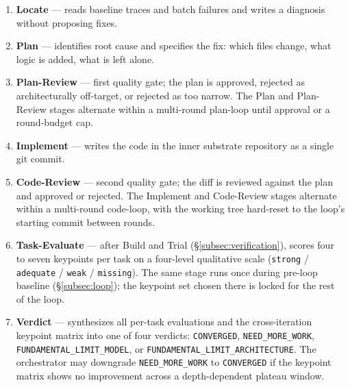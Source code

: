 \documentclass{article}
\begin{document}
\begin{enumerate}
  \item \textbf{Locate} --- reads baseline traces and batch failures and writes a diagnosis without proposing fixes.
  \item \textbf{Plan} --- identifies root cause and specifies the fix: which files change, what logic is added, what is left alone.
  \item \textbf{Plan-Review} --- first quality gate; the plan is approved, rejected as architecturally off-target, or rejected as too narrow. The Plan and Plan-Review stages alternate within a multi-round plan-loop until approval or a round-budget cap.
  \item \textbf{Implement} --- writes the code in the inner substrate repository as a single git commit.
  \item \textbf{Code-Review} --- second quality gate; the diff is reviewed against the plan and approved or rejected. The Implement and Code-Review stages alternate within a multi-round code-loop, with the working tree hard-reset to the loop's starting commit between rounds.
  \item \textbf{Task-Evaluate} --- after Build and Trial (\S\ref{subsec:verification}), scores four to seven keypoints per task on a four-level qualitative scale (\texttt{strong} / \texttt{adequate} / \texttt{weak} / \texttt{missing}). The same stage runs once during pre-loop baseline (\S\ref{subsec:loop}); the keypoint set chosen there is locked for the rest of the loop.
  \item \textbf{Verdict} --- synthesizes all per-task evaluations and the cross-iteration keypoint matrix into one of four verdicts: \texttt{CONVERGED}, \texttt{NEED\_MORE\_WORK}, \texttt{FUNDAMENTAL\_LIMIT\_MODEL}, or \texttt{FUNDAMENTAL\_LIMIT\_ARCHITECTURE}. The orchestrator may downgrade \texttt{NEED\_MORE\_WORK} to \texttt{CONVERGED} if the keypoint matrix shows no improvement across a depth-dependent plateau window.
\end{enumerate}
\end{document}

